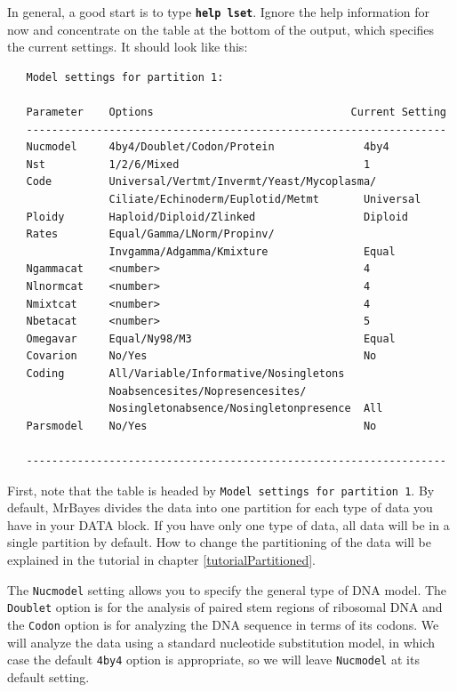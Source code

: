 \documentclass[12pt]{book}
\newcommand{\ttt}[1]{\texttt{#1}}
\newcommand{\tb}[1]{\ttt{\textbf{#1}}}
\begin{document}
In general, a good start is to type \tb{help lset}. Ignore the help information for now and
concentrate on the table at the bottom of the output, which specifies the current settings. It
should look like this:

\begin{singlespacing}
\footnotesize
\begin{verbatim}
   Model settings for partition 1:

   Parameter    Options                               Current Setting
   ------------------------------------------------------------------
   Nucmodel     4by4/Doublet/Codon/Protein              4by4
   Nst          1/2/6/Mixed                             1
   Code         Universal/Vertmt/Invermt/Yeast/Mycoplasma/
                Ciliate/Echinoderm/Euplotid/Metmt       Universal
   Ploidy       Haploid/Diploid/Zlinked                 Diploid
   Rates        Equal/Gamma/LNorm/Propinv/
                Invgamma/Adgamma/Kmixture               Equal
   Ngammacat    <number>                                4
   Nlnormcat    <number>                                4
   Nmixtcat     <number>                                4
   Nbetacat     <number>                                5
   Omegavar     Equal/Ny98/M3                           Equal
   Covarion     No/Yes                                  No
   Coding       All/Variable/Informative/Nosingletons
                Noabsencesites/Nopresencesites/
                Nosingletonabsence/Nosingletonpresence  All
   Parsmodel    No/Yes                                  No

   ------------------------------------------------------------------
\end{verbatim}
\normalsize
\end{singlespacing}

First, note that the table is headed by \ttt{Model settings for partition 1}. By default, MrBayes
divides the data into one partition for each type of data you have in your DATA block. If you have
only one type of data, all data will be in a single partition by default. How to change the
partitioning of the data will be explained in the tutorial in chapter \ref{tutorialPartitioned}.

The \ttt{Nucmodel} setting allows you to specify the general type of DNA model. The \ttt{Doublet}
option is for the analysis of paired stem regions of ribosomal DNA and the \ttt{Codon} option is
for analyzing the DNA sequence in terms of its codons. We will analyze the data using a standard
nucleotide substitution model, in which case the default \ttt{4by4} option is appropriate, so we
will leave \ttt{Nucmodel} at its default setting.
\end{document}
